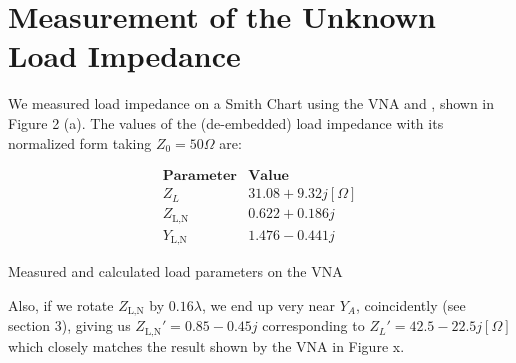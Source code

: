 \documentclass[10pt]{article}
\begin{document}
\section{Measurement of the Unknown Load Impedance}

We measured load impedance on a Smith Chart using the VNA and , shown in Figure 2 (a). The values of the 
(de-embedded) load impedance with its normalized form taking $Z_0=50\Omega$ are: 

\begin{table}[h]
  \[
      \begin{array}{c|c}
          \textbf{Parameter} & \textbf{Value} \\ \hline
          Z_L & 31.08 + 9.32j[\Omega]\\
          Z_\text{L,N} & 0.622 + 0.186j\\
          Y_\text{L,N} & 1.476 - 0.441j
      \end{array}
  \]
  \caption{Measured and calculated load parameters on the VNA}
\end{table}

Also, if we rotate $Z_\text{L,N}$ by $0.16\lambda$, we end up very near $Y_A$, coincidently (see section 3), 
giving us $Z_\text{L,N}' = 0.85 - 0.45j$ corresponding to $Z_L' = 42.5 - 22.5j [\Omega]$ which closely matches 
the result shown by the VNA in Figure x. 
\end{document}
